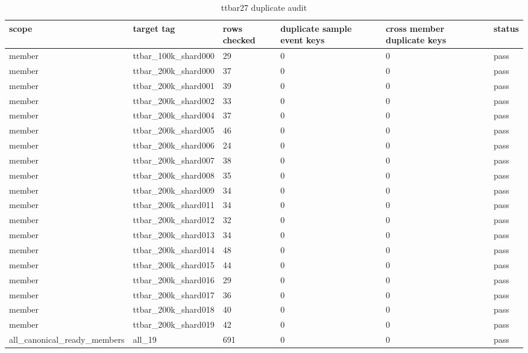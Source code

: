 \begin{table}[htbp]
\centering
\scriptsize
\begin{tabular}{llllll}
\toprule
scope & target tag & rows checked & duplicate sample event keys & cross member duplicate keys & status \\
\midrule
member & ttbar\_100k\_shard000 & 29 & 0 & 0 & pass \\
member & ttbar\_200k\_shard000 & 37 & 0 & 0 & pass \\
member & ttbar\_200k\_shard001 & 39 & 0 & 0 & pass \\
member & ttbar\_200k\_shard002 & 33 & 0 & 0 & pass \\
member & ttbar\_200k\_shard004 & 37 & 0 & 0 & pass \\
member & ttbar\_200k\_shard005 & 46 & 0 & 0 & pass \\
member & ttbar\_200k\_shard006 & 24 & 0 & 0 & pass \\
member & ttbar\_200k\_shard007 & 38 & 0 & 0 & pass \\
member & ttbar\_200k\_shard008 & 35 & 0 & 0 & pass \\
member & ttbar\_200k\_shard009 & 34 & 0 & 0 & pass \\
member & ttbar\_200k\_shard011 & 34 & 0 & 0 & pass \\
member & ttbar\_200k\_shard012 & 32 & 0 & 0 & pass \\
member & ttbar\_200k\_shard013 & 34 & 0 & 0 & pass \\
member & ttbar\_200k\_shard014 & 48 & 0 & 0 & pass \\
member & ttbar\_200k\_shard015 & 44 & 0 & 0 & pass \\
member & ttbar\_200k\_shard016 & 29 & 0 & 0 & pass \\
member & ttbar\_200k\_shard017 & 36 & 0 & 0 & pass \\
member & ttbar\_200k\_shard018 & 40 & 0 & 0 & pass \\
member & ttbar\_200k\_shard019 & 42 & 0 & 0 & pass \\
all\_canonical\_ready\_members & all\_19 & 691 & 0 & 0 & pass \\
\bottomrule
\end{tabular}
\caption{ttbar27 duplicate audit}
\label{tab:ttbar27-duplicate-audit}
\end{table}
